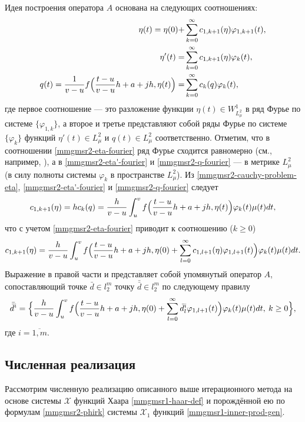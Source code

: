 Идея построения оператора $A$ основана на следующих соотношениях:
\begin{align}
\label{mmgmsr2-eta-fourier}
\eta(t) = \eta(0)+ &\sum_{k=0}^\infty c_{1,k+1}(\eta) \varphi_{1,k+1}(t),\\
\label{mmgmsr2-eta'-fourier}
\eta'(t) =  &\sum_{k=0}^\infty c_{1,k+1}(\eta)\varphi_k(t),\\
\label{mmgmsr2-q-fourier}
q(t)=
\frac{1}{v-u}f\Bigl(\frac{t-u}{v-u}h+a+jh,\eta(t)\Bigr)
= &\sum_{k=0}^\infty c_{k}(q)\varphi_k(t),
\end{align}
где первое соотношение --- это разложение функции $\eta(t) \in W^1_{L^2_\mu}$ в ряд Фурье по системе $\{\varphi_{1,k}\}$, а второе и третье представляют собой ряды Фурье по системе $\{\varphi_{k}\}$ функций $\eta'(t) \in L^2_\mu$ и $q(t) \in L^2_\mu$ соответственно.
Отметим, что в соотношении \eqref{mmgmsr2-eta-fourier} ряд Фурье сходится равномерно (см., например, \cite[теорема 2]{mmgmsr1-SHII-MMG-Demi2015}), а в \eqref{mmgmsr2-eta'-fourier} и \eqref{mmgmsr2-q-fourier} --- в метрике $L^2_\mu$ (в силу полноты системы $\varphi_{k}$ в пространстве $L^2_\mu$). Из \eqref{mmgmsr2-cauchy-problem-eta}, \eqref{mmgmsr2-eta'-fourier} и \eqref{mmgmsr2-q-fourier} следует
\begin{equation*}
c_{1,k+1}(\eta)=hc_k(q)=
\frac{h}{v-u}
\int_{u}^{v}
f\Bigl(\frac{t-u}{v-u}h+a+jh,\eta(t)\Bigr)
\varphi_k(t)\mu(t)dt,
\end{equation*}
что с учетом \eqref{mmgmsr2-eta-fourier} приводит к соотношению ($k \ge 0$)
\begin{equation*}
c_{1,k+1}(\eta)=
\frac{h}{v-u}\int_{u}^{v}f\Bigl(\frac{t-u}{v-u}h+a+jh,\eta(0)+ \sum_{l=0}^\infty c_{1,l+1}(\eta) \varphi_{1,l+1}(t)\Bigr)\varphi_k(t)\mu(t)dt.
\end{equation*}
Выражение в правой части и представляет собой упомянутый оператор $A$, сопоставляющий точке $\bar{d} \in l^m_2$ точку $\bar{\bar{d}} \in l^m_2$ по следующему правилу
\begin{equation*}
\bar{\bar{d}}^i=
\Bigl\{
\frac{h}{v-u}\int_{u}^{v}f\Bigl(\frac{t-u}{v-u}h+a+jh,\eta(0)+
\sum_{l=0}^\infty \bar{d}^i_l \varphi_{1,l+1}(t)\Bigr)\varphi_k(t)\mu(t)dt,
\: k \ge 0
\Bigr\},
\end{equation*}
где $i=\overline{1,m}$.

\subsection{Численная реализация}
Рассмотрим численную реализацию описанного выше итерационного метода на основе системы $\mathcal{X}$ функций Хаара \eqref{mmgmsr1-haar-def} и порождённой ею по формулам \eqref{mmgmsr2-phirk} системы $\mathcal{X}_1$ функций \eqref{mmgmsr1-inner-prod-gen}.

